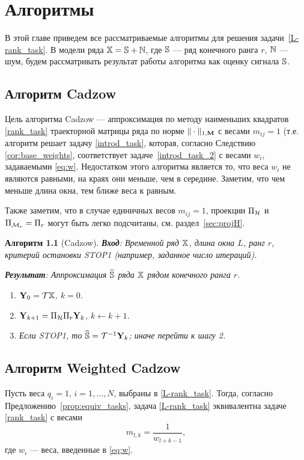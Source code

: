 \documentclass[12pt, specialist, subf,href,colorlinks=true,substylefile = spbu.rtx]{disser}
\newtheorem{algorithm}{Алгоритм}
\theoremstyle{remark}
\theoremstyle{definition}
\begin{document}
\chapter{Алгоритмы}
\label{sec:alg}
В этой главе приведем все рассматриваемые алгоритмы для решения задачи~\eqref{L-rank_task}.
В модели ряда $\mathbb{X}=\mathbb{S}+\mathbb{N}$, где $\mathbb{S}$ --- ряд конечного ранга $r$, $\mathbb{N}$ --- шум, будем рассматривать
результат работы алгоритма как оценку сигнала $\mathbb{S}$.

\section{Алгоритм Cadzow}
Цель алгоритма Cadzow \cite{Cadzow1988} --- аппроксимация по методу наименьших квадратов \eqref{rank_task} траекторной матрицы ряда по норме $\|\cdot\|_{1, \mathbf{M}}$ с весами $m_{ij}=1$ (т.е. алгоритм решает задачу \eqref{introd_task}, которая, согласно Следствию \ref{cor:base_weights}, соответствует задаче~\eqref{introd_task_2} с весами $w_i$, задаваемыми \eqref{eq:w}. Недостатком этого алгоритма является то, что веса $w_i$ не являются равными,
на краях они меньше, чем в середине. Заметим, что чем меньше длина окна, тем ближе веса к равным.

Также заметим, что в случае единичных весов $m_{ij}=1$, проекции $\Pi_{\mathcal{H}}$ и $\Pi_{\mathcal{M}_r}=\Pi_{r}$ могут быть легко подсчитаны, см. раздел~\ref{sec:projH}.

\begin{algorithm}[Cadzow]
\textbf{Вход}: Временной ряд $\mathbb{X}$, длина окна $L$, ранг $r$,
критерий остановки STOP1 (например, заданное число итераций).

\textbf{Результат}:
Аппроксимация $\widehat{\mathbb{S}}$ ряда $\mathbb{X}$ рядом конечного ранга $r$.

\begin{enumerate}
\item
$\mathbf{Y}_0 = \mathcal{T} \mathbb{X}$, $k=0$.
\item
$\mathbf{Y}_{k+1} = \Pi_{\mathcal{H}}  \Pi_{r} \mathbf{Y}_{k}$, $k\leftarrow k+1$.
\item
Если STOP1, то $\widehat{\mathbb{S}} = \mathcal{T}^{-1} \mathbf{Y}_k$; иначе перейти к шагу 2.
\end{enumerate}
\end{algorithm}


\section{Алгоритм Weighted Cadzow}
Пусть веса $q_{i}=1$, $i = 1, \ldots, N$, выбраны в \eqref{L-rank_task}. Тогда, согласно Предложению~\ref{prop:equiv_tasks}, задача \eqref{L-rank_task} эквивалентна задаче \eqref{rank_task} с весами
\begin{equation}
\label{Mw}
   m_{l, k} = \frac{1}{w_{l + k - 1}},
\end{equation}
где $w_i$ --- веса, введенные в \eqref{eq:w}.
\end{document}

